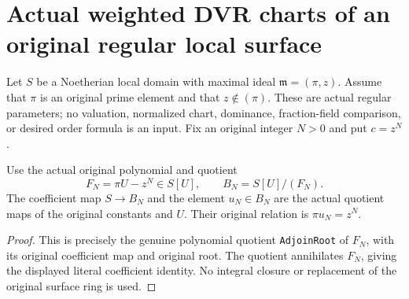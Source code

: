 \section{Actual weighted DVR charts of an original regular local surface}

Let $S$ be a Noetherian local domain with maximal ideal
$\mathfrak m=(\pi,z)$. Assume that $\pi$ is an original prime element and that
$z\notin(\pi)$. These are actual regular parameters; no valuation, normalized
chart, dominance, fraction-field comparison, or desired order formula is an
input. Fix an original integer $N>0$ and put $c=z^N$.

\begin{definition}
\label{def:gauss-regular-surface-weighted-chart}
\leanok
Use the actual original polynomial and quotient
\[
 F_N=\pi U-z^N\in S[U],\qquad B_N=S[U]/(F_N).
\]
The coefficient map $S\to B_N$ and the element $u_N\in B_N$ are the actual
quotient maps of the original constants and $U$. Their original relation is
$\pi u_N=z^N$.
\end{definition}
\begin{proof}
This is precisely the genuine polynomial quotient \texttt{AdjoinRoot} of
$F_N$, with its original coefficient map and original root. The quotient
annihilates $F_N$, giving the displayed literal coefficient identity.
No integral closure or replacement of the original surface ring is used.
\end{proof}

